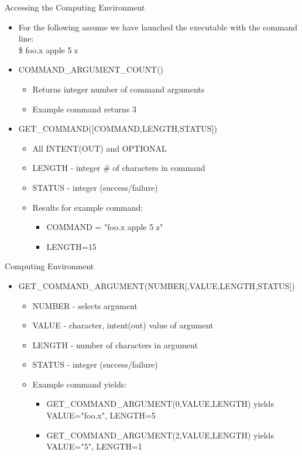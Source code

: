 \documentclass[11pt]{beamer}
\begin{document}
\begin{frame}{Accessing the Computing Environment}

\footnotesize{
\begin{itemize}
  \item For the following assume we have launched the executable with the command line: \\
  \quad \$ foo.x apple 5 z
  \item COMMAND\_ARGUMENT\_COUNT()
  \begin{itemize}
  \item Returns integer number of command arguments
  \item Example command returns 3
  \end{itemize}
 
 \item GET\_COMMAND([COMMAND,LENGTH,STATUS])
  \begin{itemize}
  \item All INTENT(OUT) and OPTIONAL
  \item LENGTH - integer \# of characters in command
  \item STATUS - integer (success/failure)
  \item Results for example command:
  \begin{itemize}
  \item COMMAND = "foo.x apple 5 z"
  \item LENGTH=15
  \end{itemize}
 \end{itemize}
\end{itemize}
}

\end{frame}



\begin{frame}{Computing Environment}

\footnotesize{
\begin{itemize}
 \item GET\_COMMAND\_ARGUMENT(NUMBER[,VALUE,LENGTH,STATUS])
  \begin{itemize}
  \item NUMBER - selects argument
  \item VALUE - character, intent(out) value of argument
  \item LENGTH - number of characters in argument
  \item STATUS - integer (success/failure)
  \item Example command yields:
  \begin{itemize}
  \item GET\_COMMAND\_ARGUMENT(0,VALUE,LENGTH) yields \\
  \quad VALUE="foo.x", LENGTH=5
  \item GET\_COMMAND\_ARGUMENT(2,VALUE,LENGTH) yields \\
  \quad VALUE="5", LENGTH=1
  \end{itemize}
 \end{itemize}
\end{itemize}
}

\end{frame}
\end{document}
